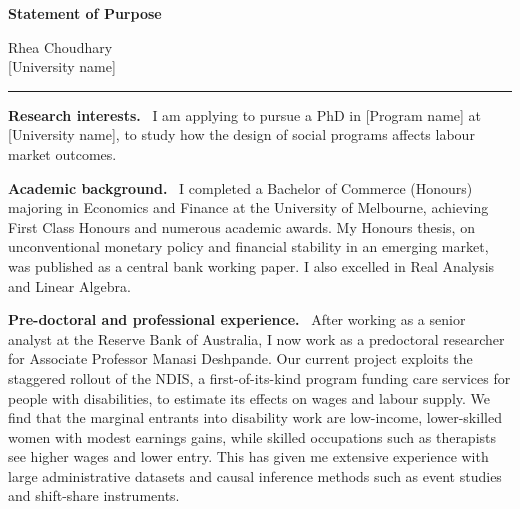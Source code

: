\documentclass[11pt]{article}
\newcommand{\school}{[University name]}
\newcommand{\program}{[Program name]}
\newcommand{\shead}[1]{\par\vspace{0.85em}\noindent\textbf{#1.}\ }
\begin{document}
\noindent
\begin{minipage}[t]{0.60\textwidth}
  {\large\bfseries Statement of Purpose}
\end{minipage}\hfill
\begin{minipage}[t]{0.38\textwidth}
  \raggedleft
  Rhea Choudhary\\[2pt]
  \school
\end{minipage}

\vspace{0.5em}
\noindent\rule{\textwidth}{0.8pt}

\vspace{1.1em}

\shead{Research interests} I am applying to pursue a PhD in \program{} at \school, to study how the design of social programs affects labour market outcomes.

\shead{Academic background} I completed a Bachelor of Commerce (Honours) majoring in Economics and Finance at the University of Melbourne, achieving First Class Honours and numerous academic awards. My Honours thesis, on unconventional monetary policy and financial stability in an emerging market, was published as a central bank working paper. I also excelled in Real Analysis and Linear Algebra.

\shead{Pre-doctoral and professional experience} After working as a senior analyst at the Reserve Bank of Australia, I now work as a predoctoral researcher for Associate Professor Manasi Deshpande. Our current project exploits the staggered rollout of the NDIS, a first-of-its-kind program funding care services for people with disabilities, to estimate its effects on wages and labour supply. We find that the marginal entrants into disability work are low-income, lower-skilled women with modest earnings gains, while skilled occupations such as therapists see higher wages and lower entry. This has given me extensive experience with large administrative datasets and causal inference methods such as event studies and shift-share instruments.
\end{document}
